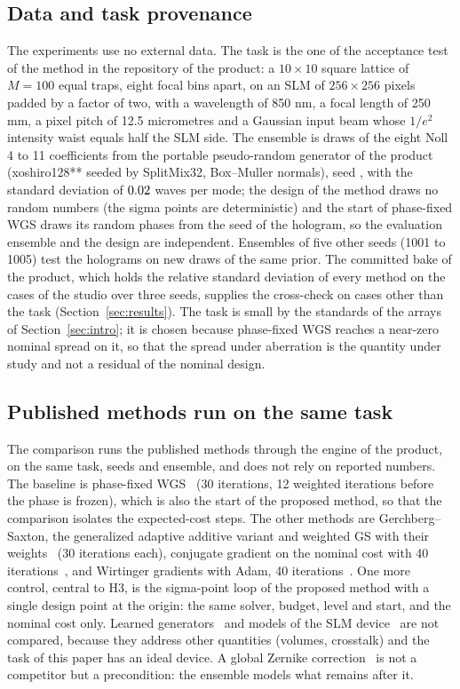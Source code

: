 \subsection{Data and task provenance}

The experiments use no external data. The task is the one of the acceptance test of the method in the repository of the product: a $10\times10$ square lattice of $M=100$ equal traps, eight focal bins apart, on an SLM of $256\times256$ pixels padded by a factor of two, with a wavelength of 850 nm, a focal length of 250 mm, a pixel pitch of
12.5 micrometres and a Gaussian input beam whose $1/e^2$ intensity waist equals half the SLM side. The ensemble is \parNens{} draws of the eight Noll 4 to 11 coefficients from the portable pseudo-random generator of the product (xoshiro128** seeded by SplitMix32, Box--Muller normals), seed \parEnsSeed, with the standard deviation of $0.02$ waves per mode; the design of the method draws no random numbers
(the sigma points are deterministic) and the start of phase-fixed WGS draws its random phases from the seed of the hologram, so the evaluation ensemble and the design are independent. Ensembles of five other seeds (1001 to 1005) test the holograms on new draws of the same prior. The committed bake of the product, which holds the relative standard deviation of every method on the
cases of the studio over three seeds, supplies the cross-check on cases other than the task (Section~\ref{sec:results}). The task is small by the standards of the arrays of Section~\ref{sec:intro}; it is chosen because phase-fixed WGS reaches a near-zero nominal spread on it, so that the spread under aberration is the quantity under study and not a residual of the nominal design.

\subsection{Published methods run on the same task}

The comparison runs the published methods through the engine of the product, on the same task, seeds and ensemble, and does not rely on reported numbers. The baseline is phase-fixed WGS~\cite{kim2019} (30 iterations, 12 weighted iterations before the phase is frozen), which is also the start of the proposed method, so that the comparison isolates the expected-cost steps.
The other methods are Gerchberg--Saxton, the generalized adaptive additive variant and weighted GS with their weights~\cite{dileonardo2007} (30 iterations each), conjugate gradient on the nominal cost with 40 iterations~\cite{harte2014}, and Wirtinger gradients with Adam, 40 iterations~\cite{chakravarthula2019}. One more control, central to H3, is the sigma-point loop of the proposed method with a single design point
at the origin: the same solver, budget, level and start, and the nominal cost only. Learned generators~\cite{eybposh2020,shi2021} and models of the SLM device~\cite{schroff2023,persson2012} are not compared, because they address other quantities (volumes, crosstalk) and the task of this paper has an ideal device. A global Zernike correction~\cite{nogrette2014} is not a competitor but a
precondition: the ensemble models what remains after it.

